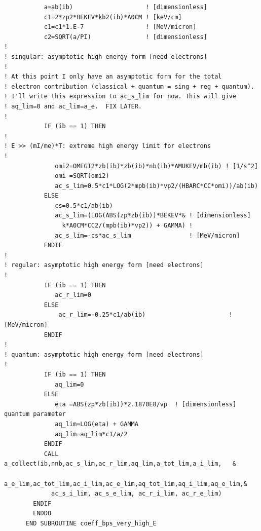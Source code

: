 \documentclass[preprint,12pt,eqsecnum,nofootinbib,amsmath,amssymb]{revtex4}
\begin{document}
{\begin{verbatim}
           a=ab(ib)                    ! [dimensionless] 
           c1=2*zp2*BEKEV*kb2(ib)*A0CM ! [keV/cm]
           c1=c1*1.E-7                 ! [MeV/micron]
           c2=SQRT(a/PI)               ! [dimensionless] 
!
! singular: asymptotic high energy form [need electrons]
!
! At this point I only have an asymptotic form for the total 
! electron contribution (classical + quantum = sing + reg + quantum).
! I'll write this expression to ac_s_lim for now. This will give
! aq_lim=0 and ac_lim=a_e.  FIX LATER. 
!
           IF (ib == 1) THEN              
!
! E >> (mI/me)*T: extreme high energy limit for electrons
!
              omi2=OMEGI2*zb(ib)*zb(ib)*nb(ib)*AMUKEV/mb(ib) ! [1/s^2]
              omi =SQRT(omi2)
              ac_s_lim=0.5*c1*LOG(2*mpb(ib)*vp2/(HBARC*CC*omi))/ab(ib)
           ELSE
              cs=0.5*c1/ab(ib)
              ac_s_lim=(LOG(ABS(zp*zb(ib))*BEKEV*& ! [dimensionless]
                k*A0CM*CC2/(mpb(ib)*vp2)) + GAMMA) !
              ac_s_lim=-cs*ac_s_lim                ! [MeV/micron]
           ENDIF
!
! regular: asymptotic high energy form [need electrons]
!
           IF (ib == 1) THEN
              ac_r_lim=0
           ELSE
               ac_r_lim=-0.25*c1/ab(ib)                       ! [MeV/micron]
           ENDIF
!
! quantum: asymptotic high energy form [need electrons]
!
           IF (ib == 1) THEN
              aq_lim=0 
           ELSE
              eta =ABS(zp*zb(ib))*2.1870E8/vp  ! [dimensionless] quantum parameter
              aq_lim=LOG(eta) + GAMMA
              aq_lim=aq_lim*c1/a/2
           ENDIF
           CALL a_collect(ib,nnb,ac_s_lim,ac_r_lim,aq_lim,a_tot_lim,a_i_lim,   &
             a_e_lim,ac_tot_lim,ac_i_lim,ac_e_lim,aq_tot_lim,aq_i_lim,aq_e_lim,&
             ac_s_i_lim, ac_s_e_lim, ac_r_i_lim, ac_r_e_lim)
        ENDIF
        ENDDO
      END SUBROUTINE coeff_bps_very_high_E
\end{verbatim}
}


\end{document}
